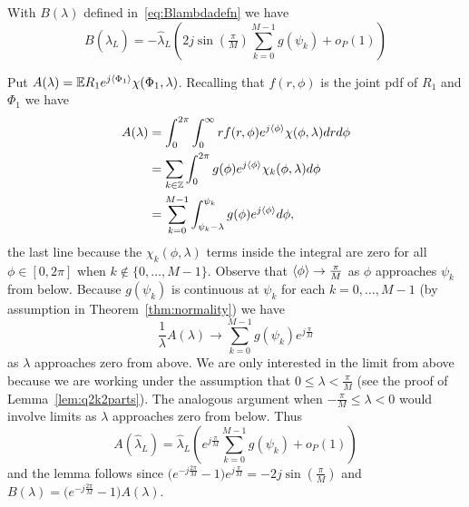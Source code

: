 \documentclass[draftcls, onecolumn, 11pt]{IEEEtran}
\begin{document}
\begin{lemma}\label{lem:Blambdaconv}
With $B(\lambda)$ defined in~\eqref{eq:Blambdadefn} we have 
\[
B(\hat{\lambda}_L) = -\hat{\lambda}_L\left(2j\sin(\tfrac{\pi}{M}) \sum_{k=0}^{M-1} g(\psi_k) + o_P(1)\right) 
\]
\end{lemma}
\begin{IEEEproof}
Put $A(\lambda) = {\mathbb E} R_1 e^{j\left\langle \Phi_1 \right\rangle} \chi(\Phi_1,\lambda)$.  Recalling that $f(r,\phi)$ is the joint pdf of $R_1$ and $\Phi_1$ we have
\begin{align*}
 A(\lambda)  &= \int_{0}^{2\pi}\int_{0}^{\infty} r f(r,\phi) e^{j\left\langle \phi \right\rangle}\chi(\phi,\lambda) dr d\phi \\
&= \sum_{k\in{\mathbb Z}}\int_{0}^{2\pi} g(\phi) e^{j\left\langle \phi \right\rangle} \chi_k(\phi,\lambda) d\phi \\
&= \sum_{k=0}^{M-1}\int_{\psi_k-\lambda}^{\psi_k} g(\phi)  e^{j\left\langle \phi \right\rangle} d\phi,
\end{align*}
the last line because the $\chi_k(\phi,\lambda)$ terms inside the integral are zero for all $\phi \in [0,2\pi]$ when $k \notin \{0,\dots,M-1\}$.  Observe that $\left\langle \phi \right\rangle \rightarrow \tfrac{\pi}{M}$ as $\phi$ approaches $\psi_k$ from below.  Because $g(\psi_k)$ is continuous at $\psi_k$ for each $k = 0, \dots, M-1$ (by assumption in Theorem~\ref{thm:normality}) we have 
\[
\frac{1}{\lambda} A(\lambda) \rightarrow \sum_{k=0}^{M-1} g(\psi_k) e^{j\tfrac{\pi}{M}}
\]
as $\lambda$ approaches zero from above.  We are only interested in the limit from above because we are working under the assumption that $0 \leq \lambda < \frac{\pi}{M}$ (see the proof of Lemma~\ref{lem:q2k2parts}).  The analogous argument when $-\tfrac{\pi}{M} \leq \lambda < 0$ would involve limits as $\lambda$ approaches zero from below.  Thus
\[
A(\hat{\lambda}_L) = \hat{\lambda}_L \left(  e^{j\tfrac{\pi}{M}} \sum_{k=0}^{M-1} g(\psi_k) + o_P(1) \right)
\]
and the lemma follows since $\big( e^{-j\tfrac{2\pi}{M}} - 1 \big) e^{j\frac{\pi}{M}} = -2j\sin(\tfrac{\pi}{M})$ and $B(\lambda) = \big( e^{-j\tfrac{2\pi}{M}} - 1 \big)A(\lambda)$.
\end{IEEEproof}
\end{document}
